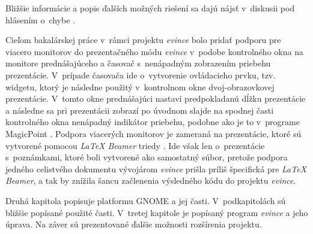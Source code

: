 \documentclass[12pt,oneside,final]{fithesis2}
\begin{document}
Bližšie informácie a popis ďalších možných riešení sa dajú nájsť v~diskusii pod hlásením o~chybe \cite{evbug}.

Cieľom bakalárskej práce v~rámci projektu \emph{evince} bolo pridať podporu pre viacero monitorov do prezentačného módu \emph{evince} v~podobe kontrolného okna na monitore prednášajúceho a časovač s~nenápadným zobrazením priebehu prezentácie.  V~prípade časovača ide o~vytvorenie ovládacieho prvku, tzv. widgetu, ktorý je následne použitý v~kontrolnom okne dvoj-obrazovkovej prezentácie. V~tomto okne prednášajúci nastaví predpokladanú dĺžku prezentácie a následne sa pri prezentácii zobrazí po úvodnom slajde na spodnej časti kontrolného okna nenápadný indikátor priebehu, podobne ako je to v~programe MagicPoint \cite{mgp}. Podpora viacerých monitorov je zameraná na prezentácie, ktoré sú vytvorené pomocou \emph{LaTeX Beamer} triedy \cite{beamer}. Ide však len o~prezentácie s~poznámkami, ktoré boli vytvorené ako samostatný súbor, pretože podpora jedného celistvého dokumentu vývojárom \emph{evince} prišla príliš špecifická pre \emph{LaTeX Beamer}, a tak by znížila šancu začlenenia výsledného kódu do projektu \emph{evince}.

Druhá kapitola popisuje platformu GNOME a jej časti. V~podkapitolách sú bližšie popísané použité časti. V~tretej kapitole je popísaný program \emph{evince} a jeho úprava. Na záver sú prezentované ďalšie možnosti rozšírenia projektu.
\end{document}

